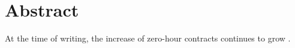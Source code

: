 \chapter{Abstract} 

At the time of writing, the increase of zero-hour contracts
continues to grow \parencite{zeroHourContracts}.
